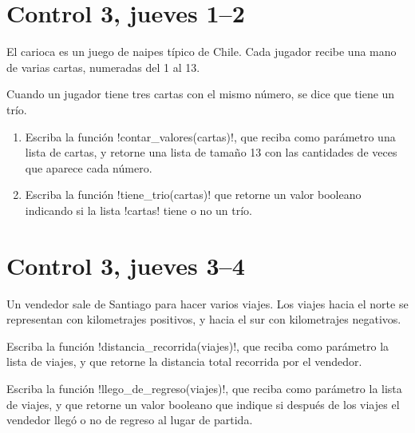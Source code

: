 \documentclass[12pt,spanish,a5paper,landscape]{article}
\begin{document}
  \newpage
  \part*{Control 3, jueves 1--2}
  \newpage
  El carioca es un juego de naipes típico de Chile.
  Cada jugador recibe una mano de varias cartas,
  numeradas del 1 al 13.

  Cuando un jugador tiene tres cartas con el mismo número,
  se dice que tiene un trío.

  \begin{enumerate}[
    labelindent=-.5in,%
    leftmargin=0pt,%
    labelsep=1em%
  ]

    \item
      Escriba la función \li!contar_valores(cartas)!,
      que reciba como parámetro una lista de cartas,
      y retorne una lista de tamaño 13
      con las cantidades de veces que aparece cada número.
      

    \item
      Escriba la función \li!tiene_trio(cartas)!
      que retorne un valor booleano
      indicando si la lista \li!cartas! tiene o no un trío.
      

  \end{enumerate}

  \newpage
  \part*{Control 3, jueves 3--4}
  \newpage

  Un vendedor sale de Santiago
  para hacer varios viajes.
  Los viajes hacia el norte
  se representan con kilometrajes positivos,
  y hacia el sur con kilometrajes negativos.

  Escriba la función \li!distancia_recorrida(viajes)!,
  que reciba como parámetro la lista de viajes,
  y que retorne la distancia total recorrida por el vendedor.

  Escriba la función \li!llego_de_regreso(viajes)!,
  que reciba como parámetro la lista de viajes,
  y que retorne un valor booleano
  que indique si después de los viajes
  el vendedor llegó o no de regreso al lugar de partida.

  
\end{document}
